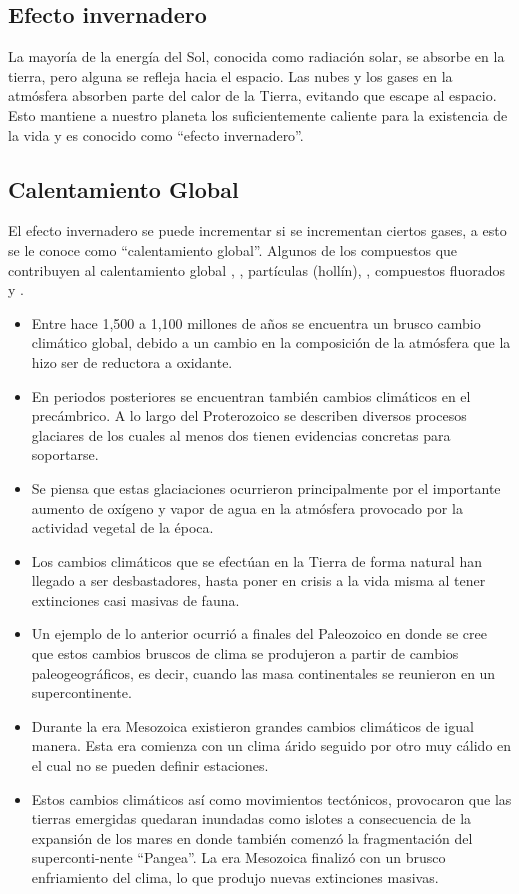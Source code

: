 \subsection{Efecto invernadero}
La mayoría de la energía del Sol, conocida como radiación solar, se absorbe en la tierra, pero alguna se refleja hacia el espacio. Las nubes y los gases en la atmósfera absorben parte del calor de la Tierra, evitando que escape al espacio. Esto mantiene a nuestro planeta los suficientemente caliente para la existencia de la vida y es conocido como ``efecto invernadero''.

\subsection{Calentamiento Global}
El efecto invernadero se puede incrementar si se incrementan ciertos gases, a esto se le conoce como ``calentamiento global''.
Algunos de los compuestos que contribuyen al calentamiento global  , , partículas (hollín), , compuestos fluorados y .
\begin{itemize}
\item  Entre hace 1,500 a 1,100 millones de años se encuentra un brusco cambio climático global, debido a un cambio en la composición de la atmósfera que la hizo ser de reductora a oxidante.
\item  En periodos posteriores se encuentran también cambios climáticos en el precámbrico. A lo largo del Proterozoico se describen diversos procesos glaciares de los cuales al menos dos tienen evidencias concretas para soportarse. 
\item  Se piensa que estas glaciaciones ocurrieron principalmente por el importante aumento de oxígeno y vapor de agua en la atmósfera provocado por la actividad vegetal de la época. 
\item  Los cambios climáticos que se efectúan en la Tierra de forma natural han llegado a ser desbastadores, hasta poner en crisis a la vida misma al tener extinciones casi masivas de fauna.
\item  Un ejemplo de lo anterior ocurrió a finales del Paleozoico en donde se cree que estos cambios bruscos de clima se produjeron a partir de cambios paleogeográficos, es decir, cuando las masa continentales se reunieron en un supercontinente.
\item  Durante la era Mesozoica existieron grandes cambios climáticos de igual manera. Esta era comienza con un clima árido seguido por otro muy cálido en el cual no se pueden definir estaciones. 
\item  Estos cambios climáticos así como movimientos tectónicos, provocaron que las tierras emergidas quedaran inundadas como islotes a consecuencia de la expansión de los mares en donde también comenzó la fragmentación del superconti-nente ``Pangea''. La era Mesozoica finalizó con un brusco enfriamiento del clima, lo que produjo nuevas extinciones masivas.
\end{itemize}

